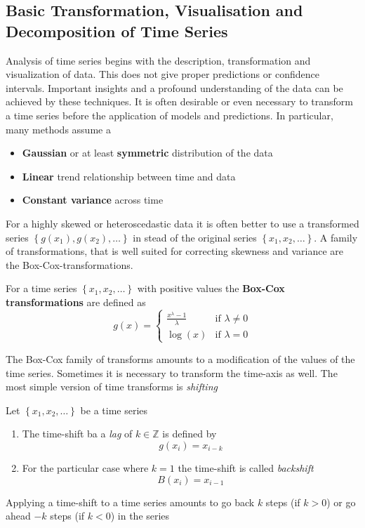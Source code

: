 \documentclass[11pt]{article}
\theoremstyle{definition}
\newcommand*\Z{\mathbb{Z}}
\begin{document}
\subsection{Basic Transformation, Visualisation and Decomposition of Time Series}
Analysis of time series begins with the description, transformation and visualization of data. This does not give proper predictions or confidence intervals. Important insights and a profound understanding of the data can be achieved by these techniques. It is often desirable or even necessary to transform a time series before the application of models and predictions. In particular, many methods assume a
\begin{itemize}[nosep]
	\item \textbf{Gaussian} or at least \textbf{symmetric} distribution of the data
	\item \textbf{Linear} trend relationship between time and data
	\item \textbf{Constant variance} across time
\end{itemize}
For a highly skewed or heteroscedastic data it is often better to use a transformed series $\left\{g(x_1), g(x_2), \dots\right\}$ in stead of the original series $\left\{x_1,x_2,\dots\right\}$. A family of transformations, that is well suited for correcting skewness and variance are the Box-Cox-transformations.
\begin{definition}
	For a time series $\left\{x_1,x_2,\dots\right\}$ with positive values the \textbf{Box-Cox transformations} are defined as
	\begin{equation*}
		g(x) = \left\{\begin{matrix}
		\frac{x^\lambda - 1}{\lambda} & \text{if } \lambda \neq 0\\
		\log(x) & \text{if } \lambda = 0
		\end{matrix}\right.
	\end{equation*}
\end{definition}
The Box-Cox family of transforms amounts to a modification of the values of the time series. Sometimes it is necessary to transform the time-axis as well. The most simple version of time transforms is \emph{shifting}
\begin{definition}
	Let $\left\{x_1,x_2,\dots\right\}$ be a time series
	\begin{enumerate}
		\item The time-shift ba a \emph{lag} of $k\in\Z$ is defined by
		\begin{equation*}
			g(x_i) = x_{i-k}
		\end{equation*}
		\item For the particular case where $k=1$ the time-shift is called \emph{backshift}
		\begin{equation*}
			B(x_i) = x_{i-1}
		\end{equation*}
	\end{enumerate}
\end{definition}
Applying a time-shift to a time series amounts to go back $k$ steps (if $k > 0$) or go ahead $-k$ steps (if $k < 0$) in the series
\end{document}
